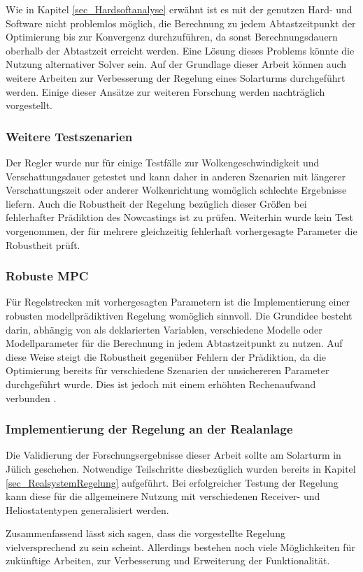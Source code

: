 Wie in Kapitel \ref{sec_Hardsoftanalyse} erwähnt ist es mit der genutzen Hard- und Software nicht problemlos möglich, die Berechnung zu jedem Abtastzeitpunkt der Optimierung bis zur Konvergenz durchzuführen, da sonst Berechnungsdauern oberhalb der Abtastzeit erreicht werden.
Eine Lösung dieses Problems könnte die Nutzung alternativer Solver sein.
Auf der Grundlage dieser Arbeit können auch weitere Arbeiten zur Verbesserung der Regelung eines Solarturms durchgeführt werden.
Einige dieser Ansätze zur weiteren Forschung werden nachträglich vorgestellt.

\subsubsection*{Weitere Testszenarien}
Der Regler wurde nur für einige Testfälle zur Wolkengeschwindigkeit und Verschattungsdauer getestet und kann daher in anderen Szenarien mit längerer Verschattungszeit oder anderer Wolkenrichtung womöglich schlechte Ergebnisse liefern.
Auch die Robustheit der Regelung bezüglich dieser Größen bei fehlerhafter Prädiktion des Nowcastings ist zu prüfen.
Weiterhin wurde kein Test vorgenommen, der für mehrere gleichzeitig fehlerhaft vorhergesagte Parameter die Robustheit prüft.

\subsubsection*{Robuste MPC}
Für Regelstrecken mit vorhergesagten Parametern ist die Implementierung einer robusten modellprädiktiven Regelung womöglich sinnvoll.
Die Grundidee besteht darin, abhängig von als  deklarierten Variablen, verschiedene Modelle oder Modellparameter für die Berechnung in jedem Abtastzeitpunkt zu nutzen.
Auf diese Weise steigt die Robustheit gegenüber Fehlern der Prädiktion, da die Optimierung bereits für verschiedene Szenarien der unsichereren Parameter durchgeführt wurde.
Dies ist jedoch mit einem erhöhten Rechenaufwand verbunden \cite[S.6ff]{Schwenzer}.

\subsubsection*{Implementierung der Regelung an der Realanlage}
Die Validierung der Forschungsergebnisse dieser Arbeit sollte am Solarturm in Jülich geschehen.
Notwendige Teilschritte diesbezüglich wurden bereits in Kapitel \ref{sec_RealsystemRegelung} aufgeführt.
Bei erfolgreicher Testung der Regelung kann diese für die allgemeinere Nutzung mit verschiedenen Receiver- und Heliostatentypen generalisiert werden.

Zusammenfassend lässt sich sagen, dass die vorgestellte Regelung vielversprechend zu sein scheint.
Allerdings bestehen noch viele Möglichkeiten für zukünftige Arbeiten, zur Verbesserung und Erweiterung der Funktionalität.
